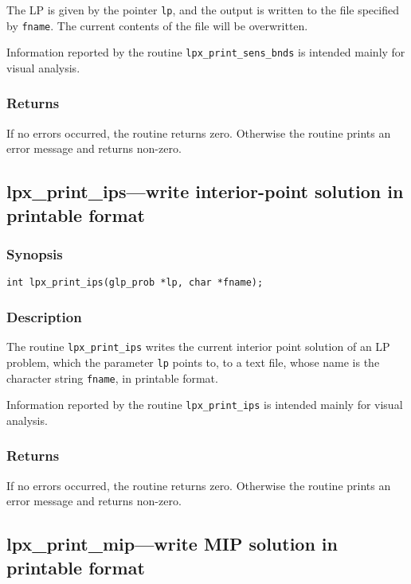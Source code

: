 The LP is given by the pointer \verb|lp|, and the output is written to
the file specified by \verb|fname|.  The current contents of the file
will be overwritten.

Information reported by the routine \verb|lpx_print_sens_bnds| is
intended mainly for visual analysis.

\subsubsection*{Returns}

If no errors occurred, the routine returns zero. Otherwise the routine
prints an error message and returns non-zero.

\subsection{lpx\_print\_ips---write interior-point solution in
printable format}

\subsubsection*{Synopsis}

\begin{verbatim}
int lpx_print_ips(glp_prob *lp, char *fname);
\end{verbatim}

\subsubsection*{Description}

The routine \verb|lpx_print_ips| writes the current interior point
solution  of an LP problem, which the parameter \verb|lp| points to, to
a text file, whose name is the character string \verb|fname|, in
printable format.

Information reported by the routine \verb|lpx_print_ips| is intended
mainly  for visual analysis.

\subsubsection*{Returns}

If no errors occurred, the routine returns zero. Otherwise the routine
prints an error message and returns non-zero.

\subsection{lpx\_print\_mip---write MIP solution in printable format}

